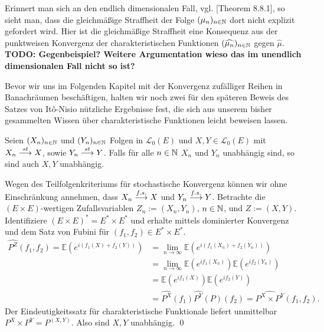 \begin{remark}
    Erinnert man sich an den endlich dimensionalen Fall, vgl. \cite{Bogachev}[Theorem 8.8.1], so sieht man, dass die gleichmäßige Straffheit der Folge $(\mu_n)_{n \in \mathbb{N}}$ dort nicht explizit gefordert wird. 
    Hier ist die gleichmäßige Straffheit eine Konsequenz aus der punktweisen Konvergenz der charakteristischen Funktionen $(\widehat{\mu_n})_{n \in \mathbb{N}}$ gegen $\widehat{\mu}$. 
    \textbf{TODO: Gegenbeispiel? Weitere Argumentation wieso das im unendlich dimensionalen Fall nicht so ist?}
\end{remark}

Bevor wir uns im Folgenden Kapitel mit der Konvergenz zufälliger Reihen in Banachräumen beschäftigen, halten wir noch zwei für den späteren Beweis des Satzes von Itô-Nisio nützliche Ergebnisse fest, die sich aus unserem bisher gesammelten Wissen über charakteristische Funktionen leicht beweisen lassen.  

\begin{proposition}
    Seien $(X_n)_{n \in \mathbb{N}}$ und $(Y_n)_{n \in \mathbb{N}}$ Folgen in $\mathcal{L}_0(E)$ und $X,Y \in \mathcal{L}_0(E)$ mit $X_n \overset{st}{\longrightarrow} X$, sowie $Y_n \overset{st}{\longrightarrow} Y$. 
    Falls für alle $n \in \mathbb{N}$ $X_n$ und $Y_n$ unabhängig sind, so sind auch $X,Y$ unabhängig. 
\end{proposition}

\begin{proof*}%
    Wegen des Teilfolgenkriteriums für stochastische Konvergenz können wir ohne Einschränkung annehmen, dass $X_n \overset{f.s.}{\longrightarrow} X$ und $Y_n \overset{f.s.}{\longrightarrow} Y$. 
    Betrachte die $(E \times E)$-wertigen Zufallsvariablen $Z_n:=(X_n,Y_n)$, $n \in \mathbb{N}$, und $Z:=(X,Y)$. 
    Identifiziere $(E \times E)^* = E^* \times E^*$ und erhalte mittels dominierter Konvergenz und dem Satz von Fubini für $(f_1,f_2) \in E^* \times E^*$. 
    \begin{align*}
        \widehat{P^Z}(f_1,f_2) = \mathbb{E}(e^{i(f_1(X) + f_2(Y))}) &= \lim_{n \to \infty}\mathbb{E}(e^{i(f_1(X_n) + f_2(Y_n))})  \\\
                                                       &= \lim_{n \to \infty}\mathbb{E}(e^{if_1(X_n)})\mathbb{E}(e^{if_2(Y_n)}) \\\
                                                       &= \mathbb{E}(e^{if_1(X)})\mathbb{E}(e^{if_2(Y)})  \\\
                                                       &= \widehat{P^X}(f_1)\widehat{P^Y}(P)(f_2) = \widehat{P^X \times P^Y}(f_1, f_2).
    \end{align*}
    Der Eindeutigkeitssatz für charakteristische Funktionale liefert unmittelbar $P^X \times P^Y = P^{(X,Y)}$. Also sind $X,Y$ unabhängig. \qed
\end{proof*}


